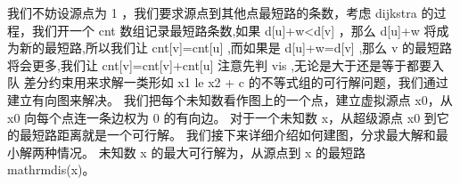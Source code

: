 {}
\markdownRendererSectionEnd \markdownRendererSectionBegin
{}\markdownRendererInterblockSeparator
{}我们不妨设源点为\markdownRendererDollarSign{} 1 \markdownRendererDollarSign{}，我们要求源点到其他点最短路的条数，考虑\markdownRendererDollarSign{} dijkstra \markdownRendererDollarSign{}的过程，我们开一个\markdownRendererDollarSign{} cnt \markdownRendererDollarSign{}数组记录最短路条数,如果\markdownRendererDollarSign{} d[u]+w<d[v] \markdownRendererDollarSign{}，那么\markdownRendererDollarSign{} d[u]+w \markdownRendererDollarSign{}将成为新的最短路,所以我们让\markdownRendererDollarSign{} cnt[v]=cnt[u] \markdownRendererDollarSign{},而如果是\markdownRendererDollarSign{} d[u]+w=d[v] \markdownRendererDollarSign{},那么\markdownRendererDollarSign{} v \markdownRendererDollarSign{}的最短路将会更多,我们让\markdownRendererDollarSign{} cnt[v]=cnt[v]+cnt[u] \markdownRendererDollarSign{}\markdownRendererParagraphSeparator
{}注意先判\markdownRendererDollarSign{} vis \markdownRendererDollarSign{},无论是大于还是等于都要入队\markdownRendererInterblockSeparator
{}
\markdownRendererSectionEnd \markdownRendererSectionBegin
{}\markdownRendererInterblockSeparator
{}差分约束用来求解一类形如 \markdownRendererDollarSign{}x\markdownRendererUnderscore{}1 \markdownRendererBackslash{}le x\markdownRendererUnderscore{}2 + c\markdownRendererDollarSign{} 的不等式组的可行解问题，我们通过建立有向图来解决。\markdownRendererParagraphSeparator
{}我们把每个未知数看作图上的一个点，建立虚拟源点 \markdownRendererDollarSign{}x\markdownRendererUnderscore{}0\markdownRendererDollarSign{}，从 \markdownRendererDollarSign{}x\markdownRendererUnderscore{}0\markdownRendererDollarSign{} 向每个点连一条边权为 \markdownRendererDollarSign{}0\markdownRendererDollarSign{} 的有向边。\markdownRendererHardLineBreak
{}对于一个未知数 \markdownRendererDollarSign{}x\markdownRendererDollarSign{}，从超级源点 \markdownRendererDollarSign{}x\markdownRendererUnderscore{}0\markdownRendererDollarSign{} 到它的最短路距离就是一个可行解。\markdownRendererParagraphSeparator
{}我们接下来详细介绍如何建图，分求最大解和最小解两种情况。\markdownRendererParagraphSeparator
{}\markdownRendererHardLineBreak
{}未知数 \markdownRendererDollarSign{}x\markdownRendererDollarSign{} 的最大可行解为，从源点到 \markdownRendererDollarSign{}x\markdownRendererDollarSign{} 的最短路 \markdownRendererDollarSign{}\markdownRendererBackslash{}mathrm\markdownRendererLeftBrace{}dis\markdownRendererRightBrace{}(x)\markdownRendererDollarSign{}。\markdownRendererHardLineBreak
